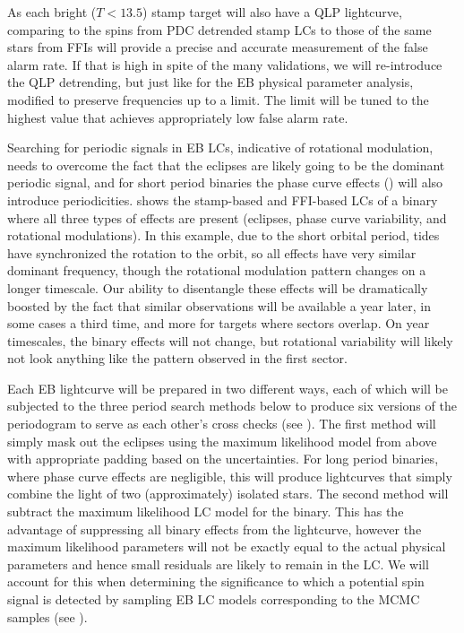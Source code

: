 As each bright ($T<13.5$) stamp target will also have a QLP lightcurve, comparing
to the spins from PDC detrended stamp LCs to those of the same stars from FFIs
will provide a precise and accurate measurement of the false alarm rate. If that
is high in spite of the many validations, we will re-introduce the QLP
detrending, but just like for the EB physical parameter analysis, modified to
preserve frequencies up to a limit. The limit will be tuned to the highest value
that achieves appropriately low false alarm rate.

Searching for periodic signals in EB LCs, indicative of rotational modulation,
needs to overcome the fact that the eclipses are likely going to be the dominant
periodic signal, and for short period binaries the phase curve effects
() will also introduce periodicities.
 shows the stamp-based and FFI-based LCs of a binary
where all three types of effects are present (eclipses, phase curve variability,
and rotational modulations). In this example, due to the short orbital period,
tides have synchronized the rotation to the orbit, so all effects have very
similar dominant frequency, though the rotational modulation pattern changes on
a longer timescale. Our ability to disentangle these effects will be
dramatically boosted by the fact that similar observations will be available a
year later, in some cases a third time, and more for targets where sectors
overlap. On year timescales, the binary effects will not change, but rotational
variability will likely not look anything like the pattern observed in the first
\tess{} sector.

Each EB lightcurve will be prepared in two different ways, each of which will be
subjected to the three period search methods below to produce six versions of
the periodogram to serve as each other's cross checks (see
). The first method will simply mask out the
eclipses using the maximum likelihood model from above with appropriate padding
based on the uncertainties. For long period binaries, where phase curve effects
are negligible, this will produce lightcurves that simply combine the light of
two (approximately) isolated stars.  The second method will subtract the maximum
likelihood LC model for the binary.  This has the advantage of suppressing all
binary effects from the lightcurve, however the maximum likelihood parameters
will not be exactly equal to the actual physical parameters and hence small
residuals are likely to remain in the LC. We will account for this when
determining the significance to which a potential spin signal is detected by
sampling EB LC models corresponding to the MCMC samples (see
).

